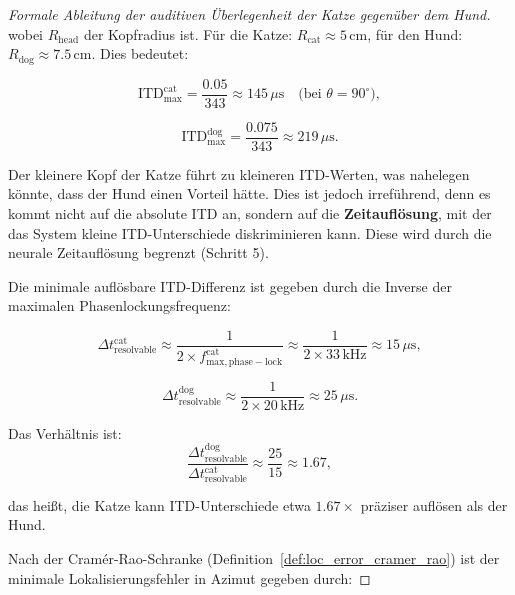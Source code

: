 ﻿\documentclass[12pt, a4paper]{article}
\theoremstyle{definition}
\theoremstyle{remark}
\begin{document}
\begin{proof}[Formale Ableitung der auditiven Überlegenheit der Katze gegenüber dem Hund]
wobei $R_{\mathrm{head}}$ der Kopfradius ist. Für die Katze: $R_{\mathrm{cat}} \approx 5\,\mathrm{cm}$, für den Hund: $R_{\mathrm{dog}} \approx 7.5\,\mathrm{cm}$. Dies bedeutet:

\begin{equation}
\text{ITD}_{\max}^{\mathrm{cat}} = \frac{0.05}{343} \approx 145\,\mu\mathrm{s} \quad \text{(bei } \theta = 90^{\circ}),
\label{eq:itd_max_cat}
\end{equation}

\begin{equation}
\text{ITD}_{\max}^{\mathrm{dog}} = \frac{0.075}{343} \approx 219\,\mu\mathrm{s}.
\label{eq:itd_max_dog}
\end{equation}

Der kleinere Kopf der Katze führt zu kleineren ITD-Werten, was nahelegen könnte, dass der Hund einen Vorteil hätte. Dies ist jedoch irreführend, denn es kommt nicht auf die absolute ITD an, sondern auf die \textbf{Zeitauflösung}, mit der das System kleine ITD-Unterschiede diskriminieren kann. Diese wird durch die neurale Zeitauflösung begrenzt (Schritt 5).

Die minimale auflösbare ITD-Differenz ist gegeben durch die Inverse der maximalen Phasenlockungsfrequenz:

\begin{equation}
\Delta t_{\text{resolvable}}^{\mathrm{cat}} \approx \frac{1}{2 \times f_{\mathrm{max, phase-lock}}^{\mathrm{cat}}} \approx \frac{1}{2 \times 33\,\mathrm{kHz}} \approx 15\,\mu\mathrm{s},
\label{eq:time_resolution_cat}
\end{equation}

\begin{equation}
\Delta t_{\text{resolvable}}^{\mathrm{dog}} \approx \frac{1}{2 \times 20\,\mathrm{kHz}} \approx 25\,\mu\mathrm{s}.
\label{eq:time_resolution_dog}
\end{equation}

Das Verhältnis ist:
\begin{equation}
\frac{\Delta t_{\text{resolvable}}^{\mathrm{dog}}}{\Delta t_{\text{resolvable}}^{\mathrm{cat}}} \approx \frac{25}{15} \approx 1.67,
\label{eq:time_resolution_ratio}
\end{equation}

das heißt, die Katze kann ITD-Unterschiede etwa $1.67\times$ präziser auflösen als der Hund.

Nach der Cramér-Rao-Schranke (Definition~\ref{def:loc_error_cramer_rao}) ist der minimale Lokalisierungsfehler in Azimut gegeben durch:


\end{proof}
\end{document}
